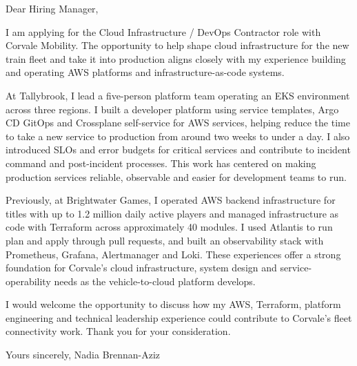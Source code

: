\documentclass[11pt,a4paper]{article}
\begin{document}
Dear Hiring Manager,

I am applying for the Cloud Infrastructure / DevOps Contractor role with Corvale Mobility. The opportunity to help shape cloud infrastructure for the new train fleet and take it into production aligns closely with my experience building and operating AWS platforms and infrastructure-as-code systems.

At Tallybrook, I lead a five-person platform team operating an EKS environment across three regions. I built a developer platform using service templates, Argo CD GitOps and Crossplane self-service for AWS services, helping reduce the time to take a new service to production from around two weeks to under a day. I also introduced SLOs and error budgets for critical services and contribute to incident command and post-incident processes. This work has centered on making production services reliable, observable and easier for development teams to run.

Previously, at Brightwater Games, I operated AWS backend infrastructure for titles with up to 1.2 million daily active players and managed infrastructure as code with Terraform across approximately 40 modules. I used Atlantis to run plan and apply through pull requests, and built an observability stack with Prometheus, Grafana, Alertmanager and Loki. These experiences offer a strong foundation for Corvale’s cloud infrastructure, system design and service-operability needs as the vehicle-to-cloud platform develops.

I would welcome the opportunity to discuss how my AWS, Terraform, platform engineering and technical leadership experience could contribute to Corvale’s fleet connectivity work. Thank you for your consideration.

Yours sincerely,
Nadia Brennan-Aziz
\end{document}
